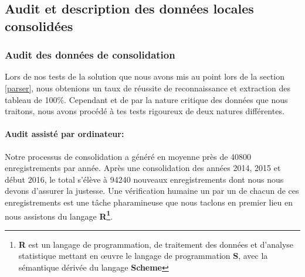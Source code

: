 	\subsection{Audit et description des données locales consolidées}
	\subsubsection{Audit des données de consolidation}
	Lors de nos tests de la solution que nous avons mis au point lors de la section \ref{parser}, nous obtenions un taux de réussite de reconnaissance et extraction des tableau de 100\%. Cependant et de par la nature critique des données que nous traitons, nous avons procédé à tes tests rigoureux de deux natures différentes.
	\paragraph{Audit assisté par ordinateur:\\}
	Notre processus de consolidation a généré en moyenne près de 40800 enregistrements par année. Après une consolidation des années 2014, 2015 et début 2016, le total s'élève à 94240 nouveaux enregistrements dont nous nous devons d'assurer la justesse. Une vérification humaine un par un de chacun de ces enregistrements est une tâche pharamineuse que nous taclons en premier lieu en nous assistons du langage \textbf{R\footnote{\textbf{R} est un langage de programmation, de traitement des données et d'analyse statistique mettant en œuvre le langage de programmation \textbf{S}, avec la sémantique dérivée du langage \textbf{Scheme}}}.
